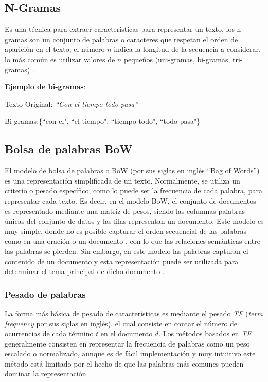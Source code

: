 \subsection{N-Gramas}
Es una técnica para extraer características para representar un texto, los n-gramas son un conjunto de palabras o caracteres que respetan el orden de aparición en el texto; el número $n$ indica la longitud de la secuencia a considerar, lo más común es utilizar valores de $n$ pequeños (uni-gramas, bi-gramas, tri-gramas) \citep{kowsari2019text}. 

\textbf{Ejemplo de bi-gramas}: 

Texto Original: \textit{``Con el tiempo todo pasa''}

Bi-gramas:\{``con el", ``el tiempo", ``tiempo todo", ``todo pasa"\}


\subsection{Bolsa de palabras BoW}
El modelo de bolsa de palabras o BoW (por sus siglas en inglés ``Bag of Words'') es una representación simplificada de un texto. Normalmente, se utiliza un criterio o pesado específico, como lo puede ser la frecuencia de cada palabra, para representar cada texto. Es decir, en el modelo BoW, el conjunto de documentos es representado mediante una matriz de pesos, siendo las columnas palabras únicas del conjunto de datos y las filas representan un documento. Este modelo es muy simple, donde no es posible capturar el orden secuencial de las palabras -como en una oración o un documento-, con lo que las relaciones semánticas entre las palabras se pierden. Sin embargo, en este modelo las palabras capturan el contenido de un documento y esta representación puede ser utilizada para determinar el tema principal de dicho documento \citep{kowsari2019text}.


\subsubsection{Pesado de palabras} La forma más básica de pesado de características es mediante el pesado \textit{TF} (\textit{term frequency} por sus siglas en inglés), el cual consiste en contar el número de ocurrencias de cada término $t$ en el documento $d$. Los métodos basados en \textit{TF} generalmente consisten en representar la frecuencia de palabras como un peso escalado o normalizado, aunque es de fácil implementación y muy intuitivo este método está limitado por el hecho de que las palabras más comunes pueden dominar la representación.

